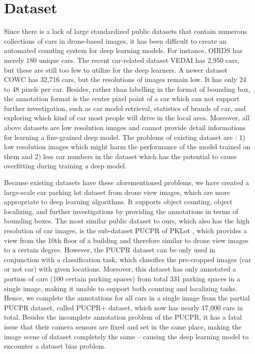 \documentclass[10pt,twocolumn,letterpaper]{article}
\begin{document}
\section{Dataset}

Since there is a lack of large standardized public datasets that contain numerous collections of cars in drone-based images, it has been difficult to create an automated counting system for deep learning models.
For instance, OIRDS \cite{34_tanner2009overhead} has merely 180 unique cars. %
The recent car-related dataset VEDAI \cite{35_razakarivony2016vehicle} has 2,950 cars, but these are still too few to utilize for the deep learners. %
A newer dataset COWC \cite{04_mundhenk2016large} has 32,716 cars, but the resolutions of images remain low. It has only 24 to 48 pixels per car. Besides, rather than labelling in the format of bounding box, the annotation format is the center pixel point of a car which can not support further investigation, such as car model retrieval, statistics of brands of car, and exploring which kind of car most people will drive in the local area.
Moreover, all above datasets are low resolution images and cannot provide detail informations for learning a fine-grained deep model. 
The problems of existing dataset are : 1) low resolution images which might harm the performance of the model trained on them and 2) less car numbers in the dataset which has the potential to cause overfitting during training a deep model.


Because existing datasets have these aforementioned problems, we have created a large-scale car parking lot dataset from drone view images, which are more appropriate to deep learning algorithms. It supports object counting, object localizing, and further investigations by providing the annotations in terms of bounding boxes. %
The most similar public dataset to ours, which also has the high resolution of car images, is the sub-dataset PUCPR of PKLot \cite{01_de2015pklot}, which provides a view from the 10th floor of a building and therefore similar to drone view images to a certain degree.
However, the PUCPR dataset can be only used in conjunction with a classification task, which classifies the pre-cropped images (car or not car) with given locations. Moreover, this dataset has only annotated a portion of cars (100 certain parking spaces) from total 331 parking spaces in a single image, making it unable to support both counting and localizing tasks. Hence, we complete the annotations for all cars in a single image from the partial PUCPR dataset, called PUCPR+ dataset, which now has nearly 17,000 cars in total. Besides the incomplete annotation problem of the PUCPR, it has a fatal issue that their camera sensors are fixed and set in the same place, making the image scene of dataset completely the same -- causing the deep learning model to encounter a dataset bias problem. 
\end{document}
